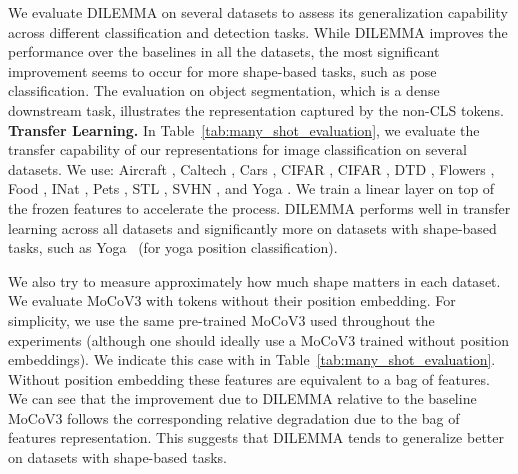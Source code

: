 \documentclass[letterpaper]{article} \usepackage{aaai23}  \usepackage{times}  \usepackage{helvet}  \usepackage{courier}  \usepackage[hyphens]{url}  \usepackage{graphicx} \urlstyle{rm} \def\UrlFont{\rm}  \usepackage{natbib}  \usepackage{caption} \frenchspacing  \setlength{\pdfpagewidth}{8.5in}  \setlength{\pdfpageheight}{11in}  \usepackage{algorithm}
\newcommand{\methodname}{DILEMMA}
\begin{document}
We evaluate {\methodname} on several datasets to assess its generalization capability across different classification and detection tasks. While {\methodname} improves the performance over the baselines in all the datasets, the most significant improvement seems to occur for more shape-based tasks, such as pose classification. The evaluation on object segmentation, which is a dense downstream task, illustrates the representation captured by the non-CLS tokens.\\

\noindent\textbf{Transfer Learning.}
In Table~\ref{tab:many_shot_evaluation}, we evaluate the transfer capability of our representations for image classification on several datasets. We use: Aircraft \cite{maji13fine-grained}, Caltech \cite{FeiFei2004LearningGV}, Cars \cite{KrauseStarkDengFei-Fei_3DRR2013}, CIFAR \cite{Krizhevsky2009LearningML}, CIFAR \cite{Krizhevsky2009LearningML}, DTD \cite{cimpoi14describing}, Flowers \cite{Nilsback2008AutomatedFC}, Food \cite{bossard14}, INat \cite{inaturalist19}, Pets \cite{parkhi12a}, STL \cite{Coates2011AnAO}, SVHN \cite{Netzer2011}, and Yoga \cite{verma2020yoga}. We train a linear layer on top of the frozen features to accelerate the process. {\methodname} performs well in transfer learning across all datasets and significantly more on datasets with  shape-based tasks, such as Yoga~\cite{verma2020yoga} (for yoga position classification).

We also try to measure approximately how much shape matters in each dataset. 
We evaluate MoCoV3 with tokens without their position embedding. For simplicity, we use the same pre-trained MoCoV3 used throughout the experiments (although one should ideally use a MoCoV3 trained without position embeddings).
We indicate this case with  in Table~\ref{tab:many_shot_evaluation}. Without position embedding these features are equivalent to a bag of features. We can see that the improvement due to {\methodname} relative to the baseline MoCoV3 follows the corresponding relative degradation due to the bag of features representation. This suggests that {\methodname} tends to generalize better on datasets with shape-based tasks.\\
\end{document}
